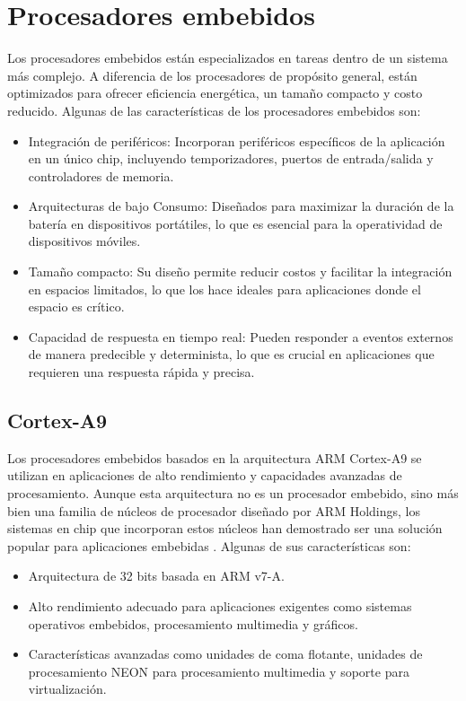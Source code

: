 \section{Procesadores embebidos}

Los procesadores embebidos están especializados en tareas dentro de un sistema más complejo. A diferencia de los procesadores de propósito general, están 
optimizados para ofrecer eficiencia energética, un tamaño compacto y costo reducido. Algunas de las características de los procesadores embebidos son:

\begin{itemize}
    \item Integración de periféricos: Incorporan periféricos específicos de la aplicación en un único chip, incluyendo temporizadores, puertos de entrada/salida y controladores 
    de memoria.
    \item Arquitecturas de bajo Consumo: Diseñados para maximizar la duración de la batería en dispositivos portátiles, lo que es esencial para la operatividad de dispositivos 
    móviles.
    \item Tamaño compacto: Su diseño permite reducir costos y facilitar la integración en espacios limitados, lo que los hace ideales para aplicaciones donde el espacio es 
    crítico.
    \item Capacidad de respuesta en tiempo real: Pueden responder a eventos externos de manera predecible y determinista, lo que es crucial en aplicaciones que requieren una respuesta rápida y precisa.
\end{itemize}

\subsection{Cortex-A9}

Los procesadores embebidos basados en la arquitectura ARM Cortex-A9 se utilizan en aplicaciones de alto rendimiento y capacidades avanzadas de procesamiento.
Aunque esta arquitectura no es un procesador embebido, sino más bien una familia de núcleos de procesador diseñado por ARM Holdings, los sistemas en chip que incorporan
estos núcleos han demostrado ser una solución popular para aplicaciones embebidas \cite{Schwiegelshohn2014DesignOA}. Algunas de sus características son: 

\begin{itemize}
    \item Arquitectura de 32 bits basada en ARM v7-A.
    \item Alto rendimiento adecuado para aplicaciones exigentes como sistemas operativos embebidos, procesamiento multimedia y gráficos.
    \item Características avanzadas como unidades de coma flotante, unidades de procesamiento NEON para procesamiento multimedia y soporte para virtualización.
\end{itemize}

